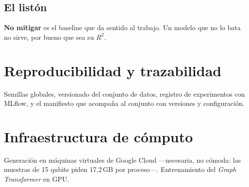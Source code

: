 \subsection{El listón}
\textbf{No mitigar} es el baseline que da sentido al trabajo. Un modelo que no lo bata no
sirve, por bueno que sea su $R^2$.

\section{Reproducibilidad y trazabilidad}
\label{sec:mlops}
Semillas globales, versionado del conjunto de datos, registro de experimentos con MLflow, y el
manifiesto que acompaña al conjunto con versiones y configuración.

\section{Infraestructura de cómputo}
\label{sec:infra}
Generación en máquinas virtuales de Google Cloud —necesaria, no cómoda: las muestras de 15
qubits piden 17,2\,GB por proceso—. Entrenamiento del \textit{Graph Transformer} en GPU.

